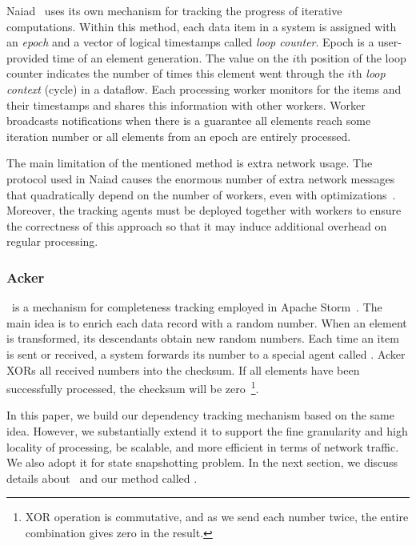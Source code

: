 Naiad~\cite{Murray:2013:NTD:2517349.2522738} uses its own mechanism for tracking the progress of iterative computations. Within this method, each data item in a system is assigned with an {\em epoch} and a vector of logical timestamps called {\em loop counter}. Epoch is a user-provided time of an element generation. The value on the $i$th position of the loop counter indicates the number of times this element went through the $i$th {\em loop context} (cycle) in a dataflow. Each processing worker monitors for the items and their timestamps and shares this information with other workers. Worker broadcasts notifications when there is a guarantee all elements reach some iteration number or all elements from an epoch are entirely processed.

The main limitation of the mentioned method is extra network usage. The protocol used in Naiad causes the enormous number of extra network messages that quadratically depend on the number of workers, even with optimizations~\cite{Murray:2013:NTD:2517349.2522738}. Moreover, the tracking agents must be deployed together with workers to ensure the correctness of this approach so that it may induce additional overhead on regular processing.

\subsubsection{Acker}

\acker\ is a mechanism for completeness tracking employed in Apache Storm~\cite{apache:storm}. The main idea is to enrich each data record with a random number. When an element is transformed, its descendants obtain new random numbers. Each time an item is sent or received, a system forwards its number to a special agent called {\em \acker}. Acker XORs all received numbers into the checksum. If all elements have been successfully processed, the checksum will be zero~\footnote{XOR operation is commutative, and as we send each number twice, the entire combination gives zero in the result.}.

In this paper, we build our dependency tracking mechanism based on the same idea. However, we substantially extend it to support the fine granularity and high locality of processing, be scalable, and more efficient in terms of network traffic. We also adopt it for state snapshotting problem. In the next section, we discuss details about \acker\ and our method called \tracker .